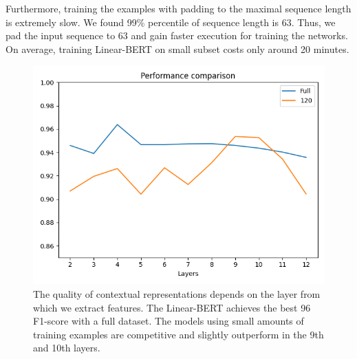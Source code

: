 \documentclass[11pt,a4paper]{article}
\begin{document}
Furthermore, training the examples with padding to the maximal sequence length is extremely slow. We found 99\% percentile of sequence length is 63. Thus, we pad the input sequence to 63 and gain faster execution for training the networks. On average, training Linear-BERT on small subset costs only around 20 minutes.


\begin{figure}
\begin{center}
  \includegraphics[width=\linewidth]{f1-comp.png}
  \caption{\label{fig:f1-comp}The quality of contextual representations depends on the layer from which we extract features. The Linear-BERT achieves the best 96 F1-score with a full dataset. The models using small amounts of training examples are competitive and slightly outperform in the 9th and 10th layers. 
}
\end{center}
\end{figure}
\end{document}
